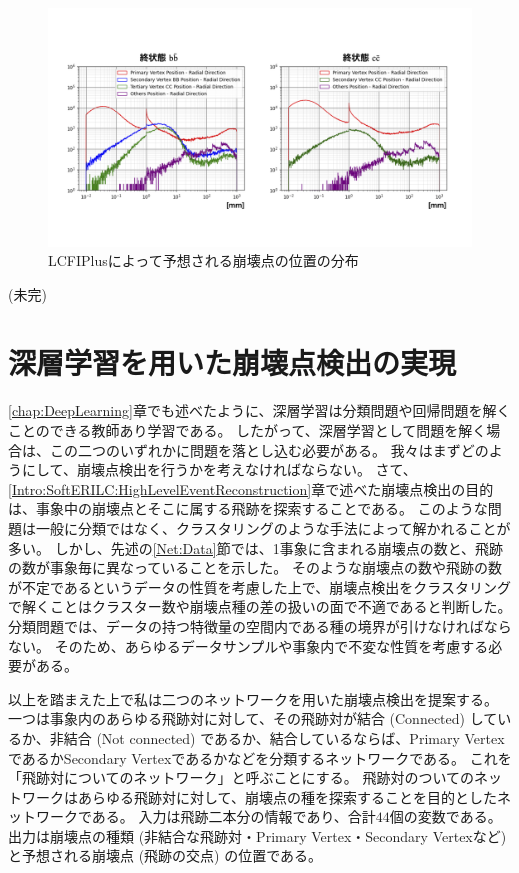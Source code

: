 \begin{figure}[htbp]
 \centering
 \includegraphics[trim = 50 100 50 150, width=1.0\textwidth, clip]{Figure/3Networks/3-1-2-3VertexPositions.png}
 \caption{LCFIPlusによって予想される崩壊点の位置の分布}
 \label{3-1-2-3VertexPositions}
\end{figure}


(未完)

\section{深層学習を用いた崩壊点検出の実現} \label{Net:forVertexFinderwithDL}

\ref{chap:DeepLearning}章でも述べたように、深層学習は分類問題や回帰問題を解くことのできる教師あり学習である。
したがって、深層学習として問題を解く場合は、この二つのいずれかに問題を落とし込む必要がある。
我々はまずどのようにして、崩壊点検出を行うかを考えなければならない。
さて、\ref{Intro:SoftERILC:HighLevelEventReconstruction}章で述べた崩壊点検出の目的は、事象中の崩壊点とそこに属する飛跡を探索することである。
このような問題は一般に分類ではなく、クラスタリングのような手法によって解かれることが多い。
しかし、先述の\ref{Net:Data}節では、1事象に含まれる崩壊点の数と、飛跡の数が事象毎に異なっていることを示した。
そのような崩壊点の数や飛跡の数が不定であるというデータの性質を考慮した上で、崩壊点検出をクラスタリングで解くことはクラスター数や崩壊点種の差の扱いの面で不適であると判断した。
分類問題では、データの持つ特徴量の空間内である種の境界が引けなければならない。
そのため、あらゆるデータサンプルや事象内で不変な性質を考慮する必要がある。

以上を踏まえた上で私は二つのネットワークを用いた崩壊点検出を提案する。
一つは事象内のあらゆる飛跡対に対して、その飛跡対が結合 (Connected) しているか、非結合 (Not connected) であるか、結合しているならば、Primary VertexであるかSecondary Vertexであるかなどを分類するネットワークである。
これを「飛跡対についてのネットワーク」と呼ぶことにする。
飛跡対のついてのネットワークはあらゆる飛跡対に対して、崩壊点の種を探索することを目的としたネットワークである。
入力は飛跡二本分の情報であり、合計$44$個の変数である。
出力は崩壊点の種類 (非結合な飛跡対・Primary Vertex・Secondary Vertexなど) と予想される崩壊点 (飛跡の交点) の位置である。

